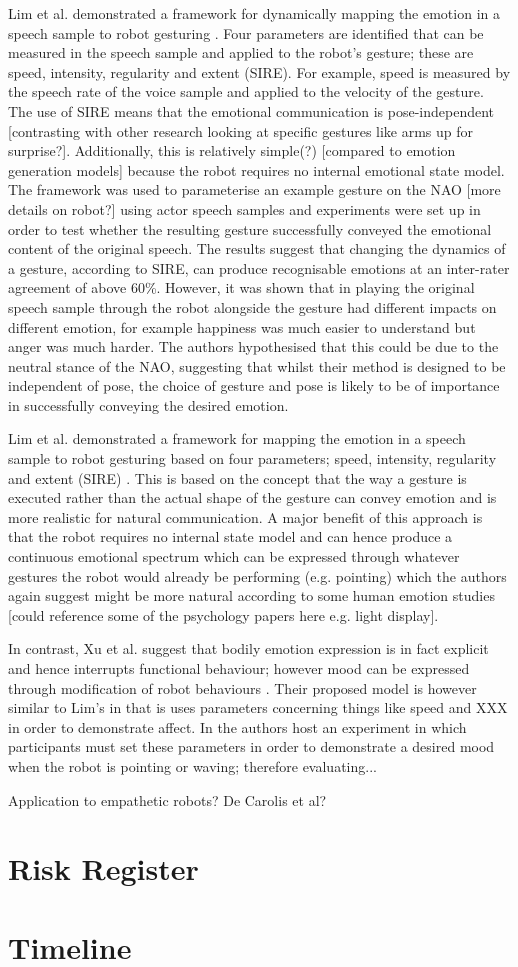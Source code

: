 \documentclass[]{article}
\begin{document}
Lim et al. demonstrated a framework for dynamically mapping the emotion in a speech sample to robot gesturing \cite{lim2011converting}. Four parameters are identified that can be measured in the speech sample and applied to the robot's gesture; these are speed, intensity, regularity and extent (SIRE). For example, speed is measured by the speech rate of the voice sample and applied to the velocity of the gesture. The use of SIRE means that the emotional communication is pose-independent [contrasting with other research looking at specific gestures like arms up for surprise?]. Additionally, this is relatively simple(?) [compared to emotion generation models] because the robot requires no internal emotional state model. The framework was used to parameterise an example gesture on the NAO [more details on robot?] using actor speech samples and experiments were set up in order to test whether the resulting gesture successfully conveyed the emotional content of the original speech. The results suggest that changing the dynamics of a gesture, according to SIRE, can produce recognisable emotions at an inter-rater agreement of above 60\%. However, it was shown that in playing the original speech sample through the robot alongside the gesture had different impacts on different emotion, for example happiness was much easier to understand but anger was much harder. The authors hypothesised that this could be due to the neutral stance of the NAO, suggesting that whilst their method is designed to be independent of pose, the choice of gesture and pose is likely to be of importance in successfully conveying the desired emotion.

Lim et al. demonstrated a framework for mapping the emotion in a speech sample to robot gesturing based on four parameters;  speed, intensity, regularity and extent (SIRE) \cite{lim2011converting}. This is based on the concept that the way a gesture is executed rather than the actual shape of the gesture can convey emotion and is more realistic for natural communication. A major benefit of this approach is that the robot requires no internal state model and can hence produce a continuous emotional spectrum which can be expressed through whatever gestures the robot would already be performing (e.g. pointing) which the authors again suggest might be more natural according to some human emotion studies [could reference some of the psychology papers here e.g. light display].

In contrast, Xu et al. suggest that bodily emotion expression is in fact explicit and hence interrupts functional behaviour; however mood can be expressed through modification of robot behaviours \cite{xu2013mood}. Their proposed model is however similar to Lim's in that is uses parameters concerning things like speed and XXX in order to demonstrate affect. In \cite{xu2013mood} the authors host an experiment in which participants must set these parameters in order to demonstrate a desired mood when the robot is pointing or waving; therefore evaluating...  

Application to empathetic robots? De Carolis et al? 


\section{Risk Register}
\section{Timeline}
\end{document}

